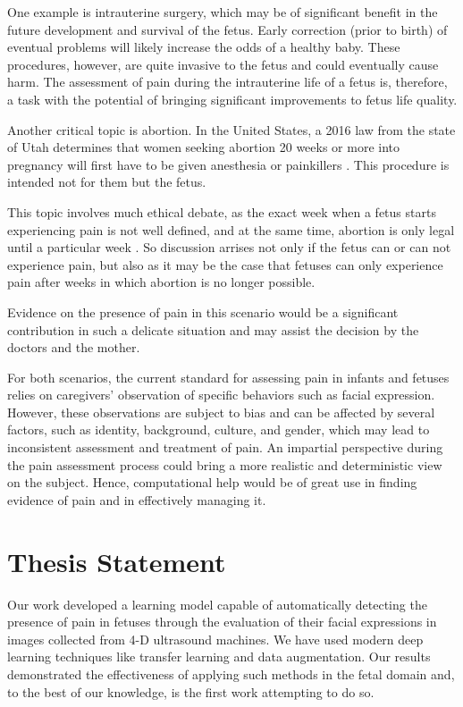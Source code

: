 One example is intrauterine surgery, which may be of significant benefit in the future development and survival of the fetus. Early correction (prior to birth) of eventual problems will likely increase the odds of a healthy baby. These procedures, however, are quite invasive to the fetus and could eventually cause harm. The assessment of pain during the intrauterine life of a fetus is, therefore, a task with the potential of bringing significant improvements to fetus life quality. 

Another critical topic is abortion. In the United States, a 2016 law from the state of Utah determines that women seeking abortion 20 weeks or more into pregnancy will first have to be given anesthesia or painkillers \citep{healy2016nytimes}. This procedure is intended not for them but the fetus. 

This topic involves much ethical debate, as the exact week when a fetus starts experiencing pain is not well defined, and at the same time, abortion is only legal until a particular week \citep{Derbyshire2006}. So discussion arrises not only if the fetus can or can not experience pain, but also as it may be the case that fetuses can only experience pain after weeks in which abortion is no longer possible.

Evidence on the presence of pain in this scenario would be a significant contribution in such a delicate situation and may assist the decision by the doctors and the mother.

For both scenarios, the current standard for assessing pain in infants and fetuses relies on caregivers' observation of specific behaviors such as facial expression. However, these observations are subject to bias and can be affected by several factors, such as identity, background, culture, and gender, which may lead to inconsistent assessment and treatment of pain. An impartial perspective during the pain assessment process could bring a more realistic and deterministic view on the subject. Hence, computational help would be of great use in finding evidence of pain and in effectively managing it.

\section{Thesis Statement}

Our work developed a learning model capable of automatically detecting the presence of pain in fetuses through the evaluation of their facial expressions in images collected from 4-D ultrasound machines. We have used modern deep learning techniques like transfer learning and data augmentation. Our results demonstrated the effectiveness of applying such methods in the fetal domain and, to the best of our knowledge, is the first work attempting to do so.

